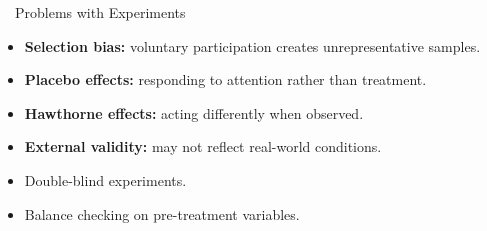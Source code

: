 \documentclass[aspectratio=169,11pt]{beamer}
\begin{document}
\begin{frame}{\ \ Problems with Experiments}
  \begin{itemize}
    \item \textbf{Selection bias:} voluntary participation creates unrepresentative samples.
    \item \textbf{Placebo effects:} responding to attention rather than treatment.
    \item \textbf{Hawthorne effects:} acting differently when observed.
    \item \textbf{External validity:} may not reflect real-world conditions.
  \end{itemize}
  \vspace{0.5em}
  \begin{keybox}[Remedies]
    \begin{itemize}
      \item Double-blind experiments.
      \item Balance checking on pre-treatment variables.
    \end{itemize}
  \end{keybox}
\end{frame}
\end{document}
